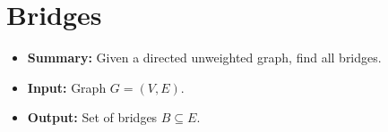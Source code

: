 \section{Bridges}
\begin{itemize}
    \item \textbf{Summary:} Given a directed unweighted graph, find all bridges.
    \item \textbf{Input:} Graph $G=(V,E)$.
    \item \textbf{Output:} Set of bridges $B \subseteq E$.
\end{itemize}

